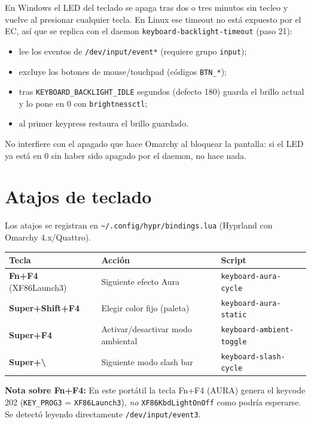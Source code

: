 \documentclass[12pt,a4paper]{article}
\begin{document}
En Windows el LED del teclado se apaga tras dos o tres minutos sin tecleo y
vuelve al presionar cualquier tecla. En Linux ese timeout no está expuesto por
el EC, así que se replica con el daemon \texttt{keyboard-backlight-timeout}
(paso 21):

\begin{itemize}[nosep]
  \item lee los eventos de \texttt{/dev/input/event*} (requiere grupo
        \texttt{input});
  \item excluye los botones de mouse/touchpad (códigos \texttt{BTN\_*});
  \item tras \texttt{KEYBOARD\_BACKLIGHT\_IDLE} segundos (defecto 180) guarda
        el brillo actual y lo pone en 0 con \texttt{brightnessctl};
  \item al primer keypress restaura el brillo guardado.
\end{itemize}

No interfiere con el apagado que hace Omarchy al bloquear la pantalla: si el
LED ya está en 0 sin haber sido apagado por el daemon, no hace nada.

\section{Atajos de teclado}

Los atajos se registran en \texttt{\textasciitilde/.config/hypr/bindings.lua}
(Hyprland con Omarchy 4.x/Quattro).

\begin{center}
\begin{tabular}{lll}
  \toprule
  Tecla & Acción & Script \\
  \midrule
  \textbf{Fn+F4} (XF86Launch3)     & Siguiente efecto Aura   & \texttt{keyboard-aura-cycle} \\
  \textbf{Super+Shift+F4}           & Elegir color fijo (paleta) & \texttt{keyboard-aura-static} \\
  \textbf{Super+F4}                 & Activar/desactivar modo ambiental & \texttt{keyboard-ambient-toggle} \\
  \textbf{Super+\textbackslash}     & Siguiente modo slash bar & \texttt{keyboard-slash-cycle} \\
  \bottomrule
\end{tabular}
\end{center}

\textbf{Nota sobre Fn+F4:} En este portátil la tecla Fn+F4 (AURA) genera el
keycode 202 (\texttt{KEY\_PROG3} = \texttt{XF86Launch3}), \emph{no}
\texttt{XF86KbdLightOnOff} como podría esperarse. Se detectó leyendo
directamente \texttt{/dev/input/event3}.
\end{document}
